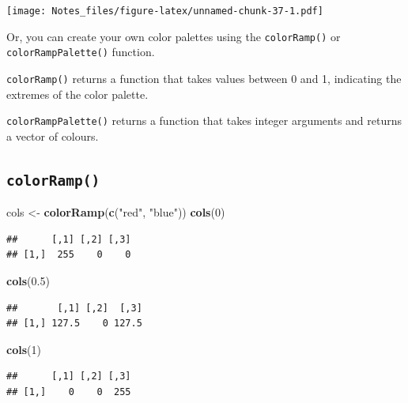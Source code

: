 \documentclass[
]{book}
\newenvironment{Shaded}{\begin{snugshade}}{\end{snugshade}}
\newcommand{\DecValTok}[1]{\textcolor[rgb]{0.00,0.00,0.81}{#1}}
\newcommand{\FloatTok}[1]{\textcolor[rgb]{0.00,0.00,0.81}{#1}}
\newcommand{\KeywordTok}[1]{\textcolor[rgb]{0.13,0.29,0.53}{\textbf{#1}}}
\newcommand{\NormalTok}[1]{#1}
\newcommand{\StringTok}[1]{\textcolor[rgb]{0.31,0.60,0.02}{#1}}
\begin{document}
\texttt{[image: Notes\_files/figure-latex/unnamed-chunk-37-1.pdf]}

Or, you can create your own color palettes using the \texttt{colorRamp()} or \texttt{colorRampPalette()} function.

\texttt{colorRamp()} returns a function that takes values between 0 and 1, indicating the extremes of the color palette.

\texttt{colorRampPalette()} returns a function that takes integer arguments and returns a vector of colours.

\hypertarget{colorramp}{%
\subsection*{\texorpdfstring{\texttt{colorRamp()}}{colorRamp()}}\label{colorramp}}

\begin{Shaded}
\begin{Highlighting}[]
\NormalTok{cols <-}\StringTok{ }\KeywordTok{colorRamp}\NormalTok{(}\KeywordTok{c}\NormalTok{(}\StringTok{"red"}\NormalTok{, }\StringTok{"blue"}\NormalTok{))}
\KeywordTok{cols}\NormalTok{(}\DecValTok{0}\NormalTok{)}
\end{Highlighting}
\end{Shaded}

\begin{verbatim}
##      [,1] [,2] [,3]
## [1,]  255    0    0
\end{verbatim}

\begin{Shaded}
\begin{Highlighting}[]
\KeywordTok{cols}\NormalTok{(}\FloatTok{0.5}\NormalTok{)}
\end{Highlighting}
\end{Shaded}

\begin{verbatim}
##       [,1] [,2]  [,3]
## [1,] 127.5    0 127.5
\end{verbatim}

\begin{Shaded}
\begin{Highlighting}[]
\KeywordTok{cols}\NormalTok{(}\DecValTok{1}\NormalTok{)}
\end{Highlighting}
\end{Shaded}

\begin{verbatim}
##      [,1] [,2] [,3]
## [1,]    0    0  255
\end{verbatim}
\end{document}
